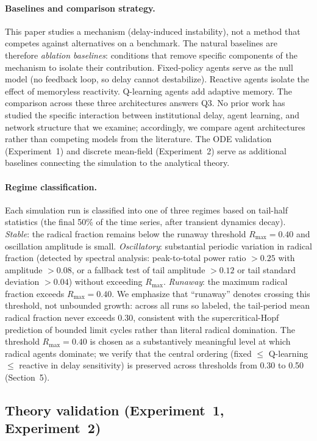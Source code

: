 \paragraph{Baselines and comparison strategy.} This paper studies a mechanism (delay-induced instability), not a method that competes against alternatives on a benchmark. The natural baselines are therefore \emph{ablation baselines}: conditions that remove specific components of the mechanism to isolate their contribution. Fixed-policy agents serve as the null model (no feedback loop, so delay cannot destabilize). Reactive agents isolate the effect of memoryless reactivity. Q-learning agents add adaptive memory. The comparison across these three architectures answers Q3. No prior work has studied the specific interaction between institutional delay, agent learning, and network structure that we examine; accordingly, we compare agent architectures rather than competing models from the literature. The ODE validation (Experiment~1) and discrete mean-field (Experiment~2) serve as additional baselines connecting the simulation to the analytical theory.

\paragraph{Regime classification.} Each simulation run is classified into one of three regimes based on tail-half statistics (the final 50\% of the time series, after transient dynamics decay). \emph{Stable}: the radical fraction remains below the runaway threshold $R_{\max}=0.40$ and oscillation amplitude is small. \emph{Oscillatory}: substantial periodic variation in radical fraction (detected by spectral analysis: peak-to-total power ratio $>0.25$ with amplitude $>0.08$, or a fallback test of tail amplitude $>0.12$ or tail standard deviation $>0.04$) without exceeding $R_{\max}$. \emph{Runaway}: the maximum radical fraction exceeds $R_{\max}=0.40$. We emphasize that ``runaway'' denotes crossing this threshold, not unbounded growth: across all runs so labeled, the tail-period mean radical fraction never exceeds $0.30$, consistent with the supercritical-Hopf prediction of bounded limit cycles rather than literal radical domination. The threshold $R_{\max}=0.40$ is chosen as a substantively meaningful level at which radical agents dominate; we verify that the central ordering (fixed $\leq$ Q-learning $\leq$ reactive in delay sensitivity) is preserved across thresholds from 0.30 to 0.50 (Section~5).

\subsection{Theory validation (Experiment~1, Experiment~2)}


